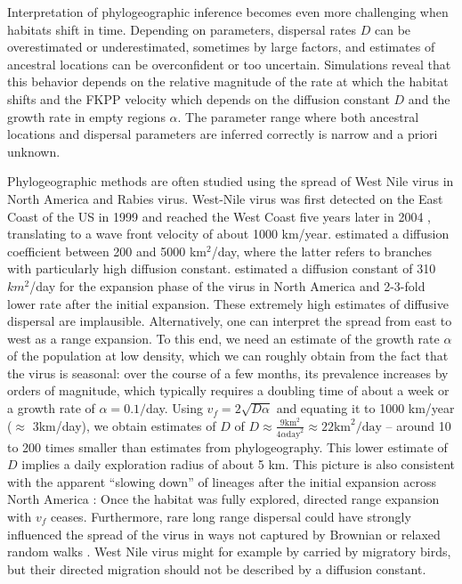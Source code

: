 \documentclass[aps,rmp, twocolumn]{revtex4}
\newcommand{\vfkpp}{v_f}
\begin{document}
Interpretation of phylogeographic inference becomes even more challenging when habitats shift in time.
Depending on parameters, dispersal rates $D$ can be overestimated or underestimated, sometimes by large factors, and estimates of ancestral locations can be overconfident or too uncertain.
Simulations reveal that this behavior depends on the relative magnitude of the rate at which the habitat shifts and the FKPP velocity which depends on the diffusion constant $D$ and the growth rate in empty regions $\alpha$.
The parameter range where both ancestral locations and dispersal parameters are inferred correctly is narrow and a priori unknown.

Phylogeographic methods are often studied using the spread of West Nile virus in North America and Rabies virus.
West-Nile virus was first detected on the East Coast of the US in 1999 and reached the West Coast five years later in 2004 \citep{pybus_unifying_2012}, translating to a wave front velocity of about 1000 km/year.
\citet{pybus_unifying_2012} estimated a diffusion coefficient between 200 and 5000 km$^2$/day, where the latter refers to branches with particularly high diffusion constant.
\citet{dellicour_how_2024} estimated a diffusion constant of 310$km^2$/day for the expansion phase of the virus in North America and 2-3-fold lower rate after the initial expansion.
These extremely high estimates of diffusive dispersal are implausible.
Alternatively, one can interpret the spread from east to west as a range expansion.
To this end, we need an estimate of the growth rate $\alpha$ of the population at low density, which we can roughly obtain from the fact that the virus is seasonal: over the course of a few months, its prevalence increases by orders of magnitude, which typically requires a doubling time of about a week or a growth rate of $\alpha=0.1/$day.
Using $\vfkpp = 2\sqrt{D\alpha}$ and equating it to 1000 km/year ($\approx$ 3km/day), we obtain estimates of $D$ of $D\approx \frac{9 \mathrm{km}^2}{4 \alpha \mathrm{day}^2} \approx 22\mathrm{km}^2/\mathrm{day}$ -- around 10 to 200 times smaller than estimates from phylogeography.
This lower estimate of $D$ implies a daily exploration radius of about 5 km.
This picture is also consistent with the apparent ``slowing down'' of lineages after the initial expansion across North America \citep{dellicour_epidemiological_2020, dellicour_how_2024}: Once the habitat was fully explored, directed range expansion with $\vfkpp$ ceases.
Furthermore, rare long range dispersal could have strongly influenced the spread of the virus in ways not captured by Brownian or relaxed random walks \citep{hallatschek_acceleration_2014}.
West Nile virus might for example by carried by migratory birds, but their directed migration should not be described by a diffusion constant.
\end{document}
